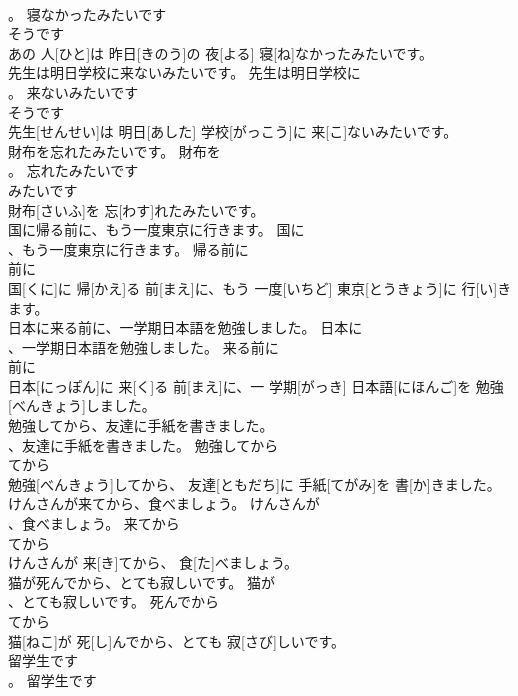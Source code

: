 \documentclass[8pt]{extreport}
\begin{document}
\begin{CJK}{UTF8}{min}
\\	。	寝なかったみたいです	
\\	そうです 
\\	あの 人[ひと]は 昨日[きのう]の 夜[よる] 寝[ね]なかったみたいです。	
\\	先生は明日学校に来ないみたいです。	先生は明日学校に
\\	。	来ないみたいです	
\\	そうです 
\\	先生[せんせい]は 明日[あした] 学校[がっこう]に 来[こ]ないみたいです。	
\\	財布を忘れたみたいです。	財布を
\\	。	忘れたみたいです	
\\	みたいです 
\\	財布[さいふ]を 忘[わす]れたみたいです。	
\\	国に帰る前に、もう一度東京に行きます。	国に
\\	、もう一度東京に行きます。	帰る前に	
\\	前に 
\\	国[くに]に 帰[かえ]る 前[まえ]に、もう 一度[いちど] 東京[とうきょう]に 行[い]きます。	
\\	日本に来る前に、一学期日本語を勉強しました。	日本に
\\	、一学期日本語を勉強しました。	来る前に	
\\	前に 
\\	日本[にっぽん]に 来[く]る 前[まえ]に、一 学期[がっき] 日本語[にほんご]を 勉強[べんきょう]しました。	
\\	勉強してから、友達に手紙を書きました。	
\\	、友達に手紙を書きました。	勉強してから	
\\	てから 
\\	勉強[べんきょう]してから、 友達[ともだち]に 手紙[てがみ]を 書[か]きました。	
\\	けんさんが来てから、食べましょう。	けんさんが
\\	、食べましょう。	来てから	
\\	てから 
\\	けんさんが 来[き]てから、 食[た]べましょう。	
\\	猫が死んでから、とても寂しいです。	猫が
\\	、とても寂しいです。	死んでから	
\\	てから 
\\	猫[ねこ]が 死[し]んでから、とても 寂[さび]しいです。	
\\	留学生です
\\	。	留学生です

\end{CJK}
\end{document}

